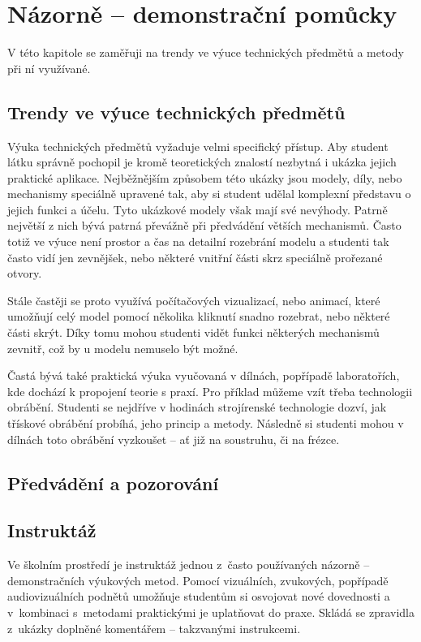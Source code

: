 \chapter{Názorně -- demonstrační pomůcky}
V této kapitole se zaměřuji na trendy ve výuce technických předmětů a metody při ní využívané.

\section{Trendy ve výuce technických předmětů}
Výuka technických předmětů vyžaduje velmi specifický přístup.
Aby student látku správně pochopil je kromě teoretických znalostí nezbytná i ukázka jejich praktické aplikace.
Nejběžnějším způsobem této ukázky jsou modely, díly, nebo mechanismy speciálně upravené tak, aby si student udělal komplexní představu o jejich funkci a účelu.
Tyto ukázkové modely však mají své nevýhody. 
Patrně největší z nich bývá patrná převážně při předvádění větších mechanismů.
Často totiž ve výuce není prostor a čas na detailní rozebrání modelu a studenti tak často vidí jen zevnějšek, nebo některé vnitřní části skrz speciálně prořezané otvory.

Stále častěji se proto využívá počítačových vizualizací, nebo animací, které umožňují celý model pomocí několika kliknutí snadno rozebrat, nebo některé části skrýt. 
Díky tomu mohou studenti vidět funkci některých mechanismů zevnitř, což by u modelu nemuselo být možné.

Častá bývá také praktická výuka vyučovaná v dílnách, popřípadě laboratořích, kde dochází k propojení teorie s praxí.
Pro příklad můžeme vzít třeba technologii obrábění.
Studenti se nejdříve v hodinách strojírenské technologie dozví, jak třískové obrábění probíhá, jeho princip a metody.
Následně si studenti mohou v dílnách toto obrábění vyzkoušet -- ať již na soustruhu, či na frézce. 

\section{Předvádění a pozorování}


\section{Instruktáž}
Ve školním prostředí je instruktáž jednou z~často používaných názorně -- demonstračních výukových metod.
Pomocí vizuálních, zvukových, popřípadě audiovizuálních podnětů umožňuje studentům si osvojovat nové dovednosti a v~kombinaci s~metodami praktickými je uplatňovat do praxe.
Skládá se zpravidla z~ukázky doplněné komentářem -- takzvanými instrukcemi.

